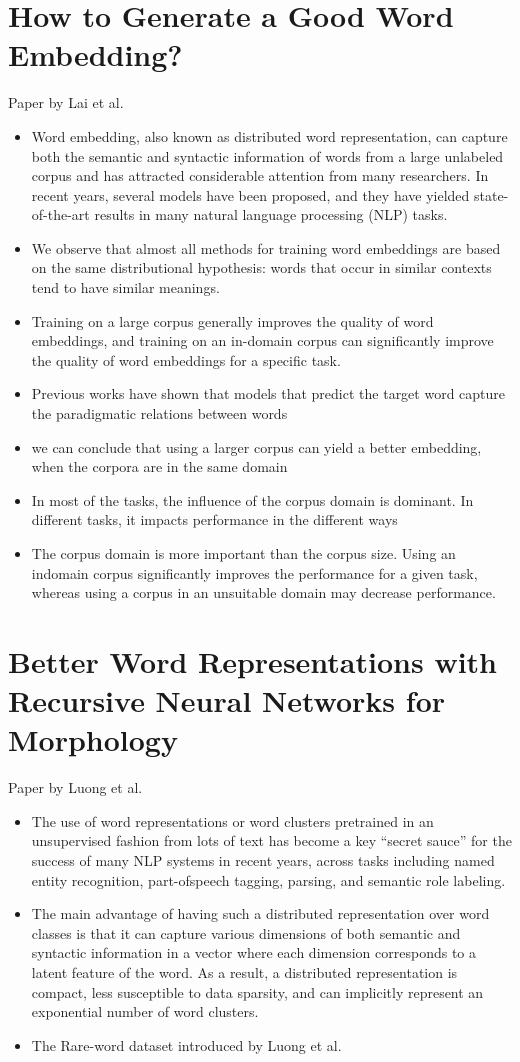\documentclass[10pt,a4paper]{article}
\begin{document}
\section{How to Generate a Good Word Embedding?}
Paper by Lai et al.\cite{lai2016generate}
\begin{itemize}
\item{Word embedding, also known as distributed word
representation, can capture both the semantic and syntactic
information of words from a large unlabeled corpus
and has attracted considerable attention from many researchers.
In recent years, several models have been proposed,
and they have yielded state-of-the-art results in many
natural language processing (NLP) tasks.}
\item{We observe that almost
all methods for training word embeddings are based on the
same distributional hypothesis: words that occur in similar
contexts tend to have similar meanings.}
\item{Training on a large corpus
generally improves the quality of word embeddings,
and training on an in-domain corpus can significantly
improve the quality of word embeddings for a specific
task.}
\item{Previous works have shown that models that predict the target word capture the paradigmatic relations between words}
\item{we can conclude that using a larger corpus can yield a better embedding, when the corpora are in the same domain}
\item{In most of the tasks, the influence of the corpus domain is
dominant. In different tasks, it impacts performance in the
different ways}
\item{The corpus
domain is more important than the corpus size. Using an indomain
corpus significantly improves the performance for a
given task, whereas using a corpus in an unsuitable domain
may decrease performance. }
\end{itemize}
\section{Better Word Representations with Recursive Neural Networks for Morphology}
Paper by Luong et al.\cite{luong2013better}
\begin{itemize}
\item{The use of word representations or word clusters
pretrained in an unsupervised fashion from lots of
text has become a key “secret sauce” for the success
of many NLP systems in recent years, across
tasks including named entity recognition, part-ofspeech
tagging, parsing, and semantic role labeling.}
\item{The main advantage of having such a distributed
representation over word classes is that it can capture
various dimensions of both semantic and syntactic
information in a vector where each dimension
corresponds to a latent feature of the word. As
a result, a distributed representation is compact,
less susceptible to data sparsity, and can implicitly
represent an exponential number of word clusters.}
\item{The Rare-word dataset introduced by Luong et al.}
\end{itemize}


\end{document}
